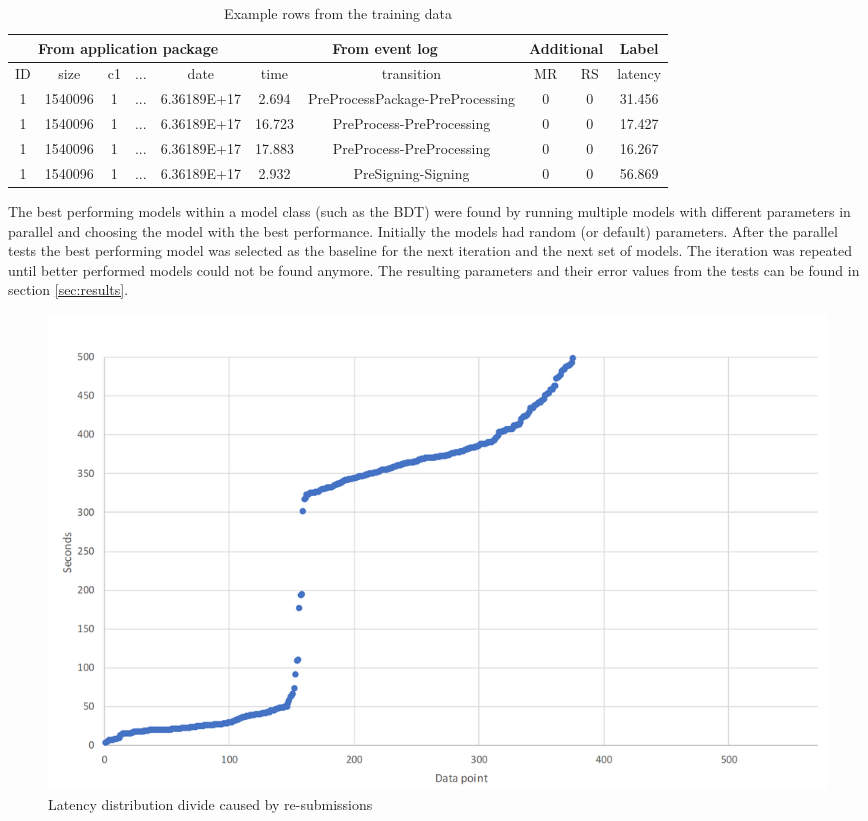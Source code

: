 \begin{table}[htb]
    \centering
    \begin{scriptsize}
    \begin{tabular}{|ccccc|cc|cc|c|}
        \hline
        \multicolumn{5}{|c|}{From application package} & \multicolumn{2}{c|}{From event log} & \multicolumn{2}{c|}{Additional} & Label\\
        \hline
        ID & size & c1 & ... & date & time & transition & MR & RS & latency\\
        \hline
        
        1 & 1540096 & 1 & ... & 6.36189E+17 & 2.694  & PreProcessPackage-PreProcessing & 0 & 0 & 31.456  \\
        1 & 1540096 & 1 & ... & 6.36189E+17 & 16.723 & PreProcess-PreProcessing        & 0 & 0 & 17.427 \\
        1 & 1540096 & 1 & ... & 6.36189E+17 & 17.883 & PreProcess-PreProcessing        & 0 & 0 & 16.267 \\
        1 & 1540096 & 1 & ... & 6.36189E+17 & 2.932  & PreSigning-Signing              & 0 & 0 & 56.869  \\
        
        \hline
    \end{tabular}
    \end{scriptsize}
    \caption{Example rows from the training data}
    \label{tab:examplerows}
\end{table}

The best performing models within a model class (such as the BDT) were found by running multiple models with different parameters in parallel and choosing the model with the best performance.
Initially the models had random (or default) parameters.
After the parallel tests the best performing model was selected as the baseline for the next iteration and the next set of models.
The iteration was repeated until better performed models could not be found anymore.
The resulting parameters and their error values from the tests can be found in section \ref{sec:results}.

\begin{figure}[p]
    \centering \includegraphics[width=0.9\linewidth]{gfx/graphs/resubmissions.png}
    \caption{Latency distribution divide caused by re-submissions}
    \label{fig:resubmissions}
\end{figure}


